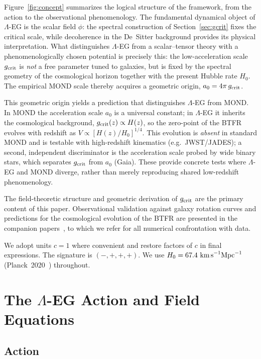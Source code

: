 \documentclass[11pt,a4paper]{article}
\begin{document}
Figure~\ref{fig:concept} summarizes the logical structure of the framework, from the
action to the observational phenomenology. The fundamental dynamical object of
$\Lambda$-EG is the scalar field $\phi$: the spectral construction of
Section~\ref{sec:gcrit} fixes the critical scale, while decoherence in the
De~Sitter background provides its physical interpretation. What distinguishes $\Lambda$-EG
from a scalar--tensor theory with a phenomenologically chosen potential is precisely this:
the low-acceleration scale $g_{\rm crit}$ is \emph{not} a free parameter tuned to galaxies,
but is fixed by the spectral geometry of the cosmological horizon together with the present
Hubble rate $H_0$. The empirical MOND scale thereby acquires a geometric origin,
$a_0 = 4\pi\,g_{\rm crit}$.

This geometric origin yields a prediction that distinguishes $\Lambda$-EG from MOND. In MOND
the acceleration scale $a_0$ is a universal constant; in $\Lambda$-EG it inherits the
cosmological background, $g_{\rm crit}(z)\propto H(z)$, so the zero-point of the BTFR evolves
with redshift as $V\propto[H(z)/H_0]^{1/4}$. This evolution is \emph{absent} in standard MOND
and is testable with high-redshift kinematics (e.g.\ JWST/JADES); a second, independent
discriminator is the acceleration scale probed by wide binary stars, which separates
$g_{\rm crit}$ from $a_0$ (Gaia). These provide concrete tests where $\Lambda$-EG and MOND
diverge, rather than merely reproducing shared low-redshift phenomenology.

The field-theoretic structure and geometric derivation of $g_{\rm crit}$ are the primary
content of this paper. Observational validation against galaxy rotation curves and
predictions for the cosmological evolution of the BTFR are presented in the companion
papers~\cite{PaperI,PaperII}, to which we refer for all numerical confrontation with data.

We adopt units $c = 1$ where convenient and restore factors of $c$ in final expressions.
The signature is $(-,+,+,+)$. We use $H_0 = 67.4\ \text{km\,s}^{-1}\text{Mpc}^{-1}$
(Planck~2020~\cite{Planck2020}) throughout.

\section{The \texorpdfstring{$\Lambda$}{Lambda}-EG Action and Field Equations}
\label{sec:action}

\subsection{Action}
\label{subsec:action}
\end{document}
